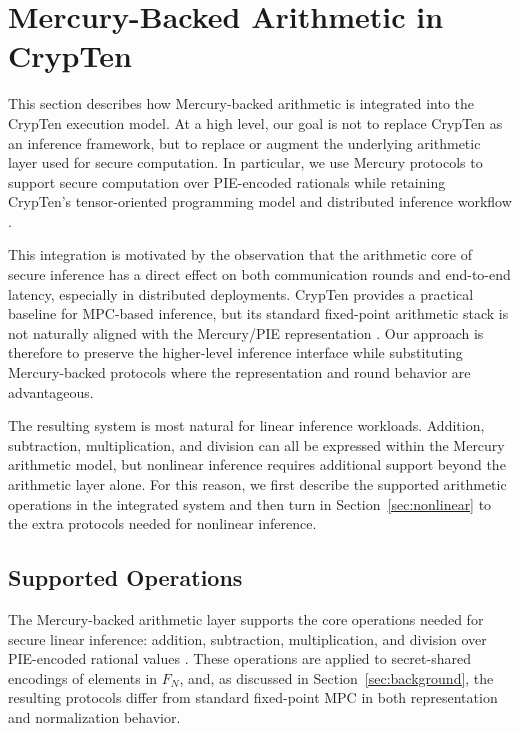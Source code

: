 \section{Mercury-Backed Arithmetic in CrypTen}
\label{sec:mercury-crypten}

This section describes how Mercury-backed arithmetic is integrated into the CrypTen execution model. 
At a high level, our goal is not to replace CrypTen as an inference framework, but to replace or augment the underlying arithmetic layer used for secure computation. 
In particular, we use Mercury protocols to support secure computation over PIE-encoded rationals while retaining CrypTen's tensor-oriented programming model and distributed inference workflow \cite{crypten-paper,mercury-paper}. %

This integration is motivated by the observation that the arithmetic core of secure inference has a direct effect on both communication rounds and end-to-end latency, especially in distributed deployments.
CrypTen provides a practical baseline for MPC-based inference, but its standard fixed-point arithmetic stack is not naturally aligned with the Mercury/PIE representation \cite{crypten-paper,fixed-point-mpc,mercury-paper}. %
Our approach is therefore to preserve the higher-level inference interface while substituting Mercury-backed protocols where the representation and round behavior are advantageous.

The resulting system is most natural for linear inference workloads.
Addition, subtraction, multiplication, and division can all be expressed within the Mercury arithmetic model, but nonlinear inference requires additional support beyond the arithmetic layer alone. 
For this reason, we first describe the supported arithmetic operations in the integrated system and then turn in Section~\ref{sec:nonlinear} to the extra protocols needed for nonlinear inference.

\subsection{Supported Operations}
\label{sec:supported-operations}

The Mercury-backed arithmetic layer supports the core operations needed for secure linear inference: addition, subtraction, multiplication, and division over PIE-encoded rational values \cite{mercury-paper}. %
These operations are applied to secret-shared encodings of elements in $F_N$, and, as discussed in Section~\ref{sec:background}, the resulting protocols differ from standard fixed-point MPC in both representation and normalization behavior.

